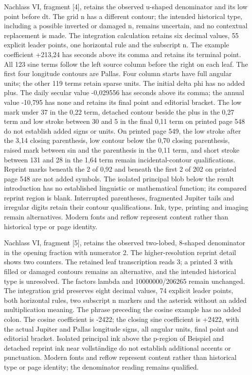 Nachlass VI, fragment [4], retains the observed u-shaped denominator and its low point before dt. The grid n has a different contour; the intended historical type, including a possible inverted or damaged n, remains uncertain, and no contextual replacement is made. The integration calculation retains six decimal values, 55 explicit leader points, one horizontal rule and the subscript n. The example coefficient +213,24 has seconds above its comma and retains its terminal point. All 123 sine terms follow the left source column before the right on each leaf. The first four longitude contours are Pallas. Four column starts have full angular units; the other 119 terms retain sparse units. The initial delta phi has no added plus. The daily secular value -0,029556 has seconds above its comma; the annual value -10,795 has none and retains its final point and editorial bracket. The low mark under 37 in the 0,22 term, detached contour beside the plus in the 0,27 term and low stroke between 30 and 5 in the final 0,11 term on printed page 548 do not establish added signs or units. On printed page 549, the low stroke after the 3,14 closing parenthesis, low contour below the 0,70 closing parenthesis, raised mark between sin and the parenthesis in the 0,11 term, and short stroke between 131 and 28 in the 1,64 term remain incidental-contour qualifications. Reprint marks beneath the 2 of 0,92 and beneath the first 2 of 202 on printed page 548 are not added symbols. The isolated principal blob below the result introduction has no established linguistic or mathematical function; its compared reprint region is blank. Interrupted parentheses, fragmented Jupiter tails and irregular digits retain their contour qualifications. Ink, type, printing and imaging remain alternatives. Modern fonts and reflow represent content rather than historical type or page identity.

Nachlass VI, fragment [5], retains the observed two-lobed, 8-shaped denominator in the opening fraction with numerator 2. The higher-resolution reprint detail shows two counters. The retained leaf transcription reads 3; a printed 3 with filled or damaged contours remains an alternative, and the intended historical type is unresolved. The factors lambda and 10000000/206265 remain unchanged. The integration grid preserves eight decimal values, 74 explicit leader points, both horizontal rules, two subscript n markers and the asterisk without an added multiplication meaning. The phrase preceding the cosine example has no added colon. The cosine coefficient is -2422; the closing sine coefficient is +2422, with the actual Jupiter and Pallas longitude signs, all angular units, final point and editorial bracket. Isolated principal ink above the p-region of Beispiel and detached reprint ink near vollständige do not establish additional accents or punctuation. Modern fonts and reflow represent content rather than historical type or page identity; the denominator reading remains qualified.

